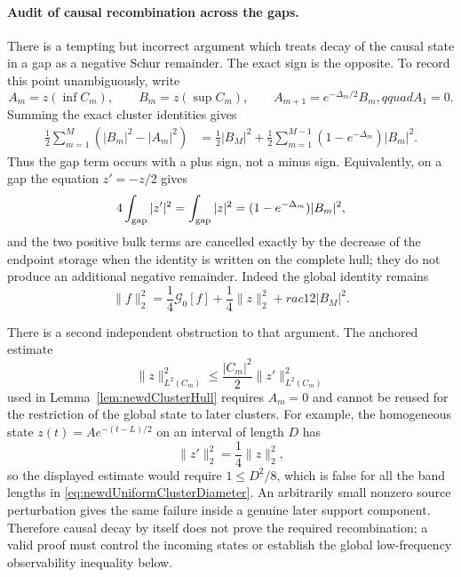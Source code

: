 \documentclass[11pt]{amsart}
\theoremstyle{definition}
\theoremstyle{remark}
\begin{document}
\paragraph{Audit of causal recombination across the gaps.}
There is a tempting but incorrect argument which treats decay of the causal
state in a gap as a negative Schur remainder.  The exact sign is the
opposite.  To record this point unambiguously, write
\[
 A_m=z(\inf C_m),\qquad B_m=z(\sup C_m),\qquad
 A_{m+1}=e^{-\Delta_m/2}B_m,qquad A_1=0.
\]
Summing the exact cluster identities gives
\begin{align}
 \frac12\sum_{m=1}^M(|B_m|^2-|A_m|^2)
 &=\frac12|B_M|^2
   +\frac12\sum_{m=1}^{M-1}
      (1-e^{-\Delta_m})|B_m|^2.
 \label{eq:newdGapAuditSign}
\end{align}
Thus the gap term occurs with a plus sign, not a minus sign.  Equivalently,
on a gap the equation $z'=-z/2$ gives
\[
 4\int_{\rm gap}|z'|^2
 =\int_{\rm gap}|z|^2
 =(1-e^{-\Delta_m})|B_m|^2,
\]
and the two positive bulk terms are cancelled exactly by the decrease of
the endpoint storage when the identity is written on the complete hull;
they do not produce an additional negative remainder.  Indeed the global
identity remains
\begin{equation}\label{eq:newdGlobalStateAuditIdentity}
 \|f\|_2^2
 =\frac14\mathcal G_0[f]
  +\frac14\|z\|_2^2+rac12|B_M|^2.
\end{equation}

There is a second independent obstruction to that argument.  The anchored
estimate
\[
 \|z\|_{L^2(C_m)}^2
 \leq\frac{|C_m|^2}{2}\|z'\|_{L^2(C_m)}^2
\]
used in Lemma~\ref{lem:newdClusterHull} requires $A_m=0$ and cannot be
reused for the restriction of the global state to later clusters.  For
example, the homogeneous state $z(t)=Ae^{-(t-L)/2}$ on an interval of
length $D$ has
\[
 \|z'\|_2^2=\frac14\|z\|_2^2,
\]
so the displayed estimate would require $1\leq D^2/8$, which is false for
all the band lengths in \eqref{eq:newdUniformClusterDiameter}.  An
arbitrarily small nonzero source perturbation gives the same failure inside
a genuine later support component.  Therefore causal decay by itself does
not prove the required recombination; a valid proof must control the
incoming states or establish the global low-frequency observability
inequality below.
\end{document}
